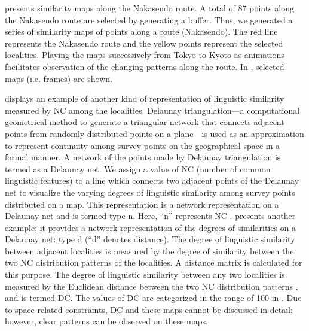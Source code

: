 \documentclass[output=paper]{LSP/langsci}
\begin{document}
 presents similarity maps along the Nakasendo route. A total of 87 points along the Nakasendo route are selected by generating a buffer. Thus, we generated a series of similarity maps of points along a route (Nakasendo). The red line represents the Nakasendo route and the yellow points represent the selected localities. Playing the maps successively from Tokyo to Kyoto as animations facilitates observation of the changing patterns along the route. In , selected maps (i.e. frames) are shown.

 displays an example of another kind of representation of linguistic similarity measured by NC among the localities. Delaunay triangulation—a computational geometrical method to generate a triangular network that connects adjacent points from randomly distributed points on a plane—is used as an approximation to represent continuity among survey points on the geographical space in a formal manner. A network of the points made by Delaunay triangulation is termed as a Delaunay net. We assign a value of NC (number of common linguistic features) to a line which connects two adjacent points of the Delaunay net to visualize the varying degrees of linguistic similarity among survey points distributed on a map. This representation is a network representation on a Delaunay net and is termed type n. Here, “n” represents NC \citep[2, 4]{kumagai_development_2013}.  presents another example; it provides a network representation of the degrees of similarities on a Delaunay net: type d (“d” denotes distance). The degree of linguistic similarity between adjacent localities is measured by the degree of similarity between the two NC distribution patterns of the localities. A distance matrix is calculated for this purpose. The degree of linguistic similarity between any two localities is measured by the Euclidean distance between the two NC distribution patterns \citep[2, 4]{kumagai_development_2013}, and is termed DC. The values of DC are categorized in the range of 100 in . Due to space-related constraints, DC and these maps cannot be discussed in detail; however, clear patterns can be observed on these maps.
\end{document}
